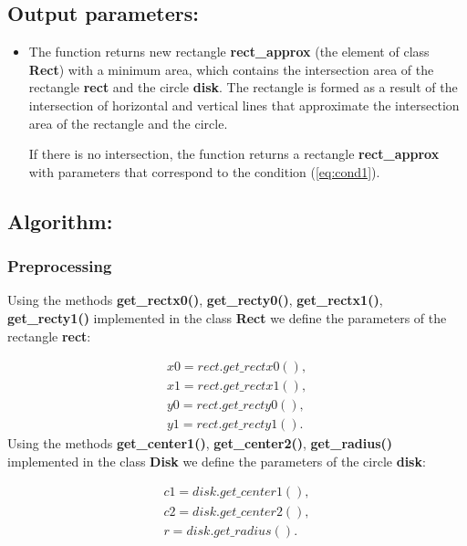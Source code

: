 \documentclass{report}
\begin{document}
	\subsection*{Output parameters:}
	
	\begin{itemize}
		\item The function returns new rectangle {\bfseries rect\_approx} (the element of class {\bfseries Rect}) with a minimum area, which contains the intersection area of the rectangle {\bfseries rect} and the circle {\bfseries disk}. The rectangle is formed as a result of the intersection of horizontal and vertical lines that approximate the intersection area of the rectangle and the circle.
		
		If there is no intersection, the function returns a rectangle {\bfseries rect\_approx} with parameters that correspond to the condition (\ref{eq:cond1}).

	\end{itemize}

	\subsection*{Algorithm:}
	
	\subsubsection*{Preprocessing}
	
	Using the methods  {\bfseries get\_rectx0()}, {\bfseries get\_recty0()}, {\bfseries get\_rectx1()}, {\bfseries get\_recty1()} implemented in the class {\bfseries Rect} we define the parameters of the rectangle {\bfseries rect}:
	
	\begin{equation}
		\begin{gathered}	
			x0 = rect.get\_rectx0(),\\
			x1 = rect.get\_rectx1(),\\
			y0 = rect.get\_recty0(),\\
			y1 = rect.get\_recty1().
			\label{eq:paramrect}
		\end{gathered}
	\end{equation}
	Using the methods {\bfseries get\_center1()}, {\bfseries get\_center2()}, {\bfseries get\_radius()} implemented in the class {\bfseries Disk} we define the parameters of the circle {\bfseries disk}:
		
	\begin{equation}
		\begin{gathered}
			c1 = disk.get\_center1(),\\
			c2 = disk.get\_center2(),\\
			r = disk.get\_radius().
			\label{eq:paramdisk}
		\end{gathered}
	\end{equation}
\end{document}
